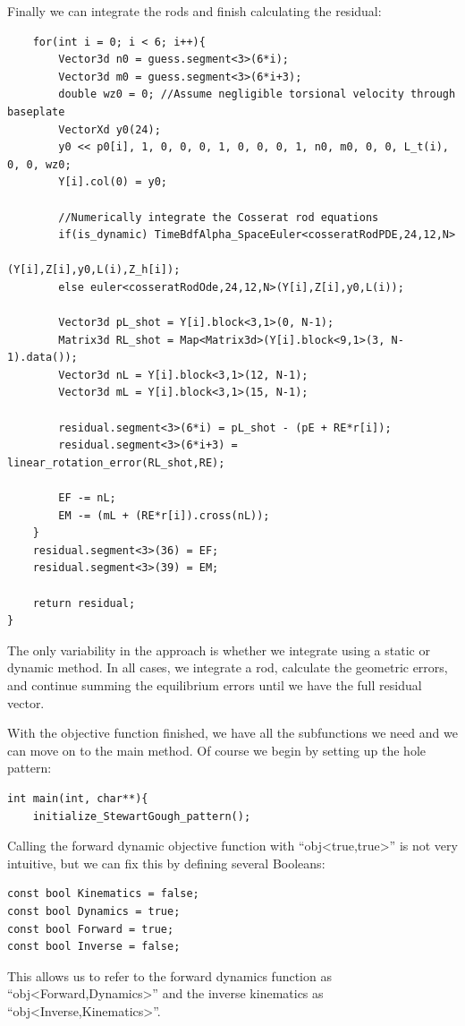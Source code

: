 \documentclass[12pt]{article}
\begin{document}
Finally we can integrate the rods and finish calculating the residual:
\begin{lstlisting}
    for(int i = 0; i < 6; i++){
        Vector3d n0 = guess.segment<3>(6*i);
        Vector3d m0 = guess.segment<3>(6*i+3);
        double wz0 = 0; //Assume negligible torsional velocity through baseplate
        VectorXd y0(24);
        y0 << p0[i], 1, 0, 0, 0, 1, 0, 0, 0, 1, n0, m0, 0, 0, L_t(i), 0, 0, wz0;
        Y[i].col(0) = y0;

        //Numerically integrate the Cosserat rod equations
        if(is_dynamic) TimeBdfAlpha_SpaceEuler<cosseratRodPDE,24,12,N>
                                              (Y[i],Z[i],y0,L(i),Z_h[i]);
        else euler<cosseratRodOde,24,12,N>(Y[i],Z[i],y0,L(i));

        Vector3d pL_shot = Y[i].block<3,1>(0, N-1);
        Matrix3d RL_shot = Map<Matrix3d>(Y[i].block<9,1>(3, N-1).data());
        Vector3d nL = Y[i].block<3,1>(12, N-1);
        Vector3d mL = Y[i].block<3,1>(15, N-1);

        residual.segment<3>(6*i) = pL_shot - (pE + RE*r[i]);
        residual.segment<3>(6*i+3) = linear_rotation_error(RL_shot,RE);

        EF -= nL;
        EM -= (mL + (RE*r[i]).cross(nL));
    }
    residual.segment<3>(36) = EF;
    residual.segment<3>(39) = EM;
		
    return residual;
}
\end{lstlisting}
The only variability in the approach is whether we integrate using a static or dynamic method. In all cases, we integrate a rod, calculate the geometric errors, and continue summing the equilibrium errors until we have the full residual vector.

With the objective function finished, we have all the subfunctions we need and we can move on to the main method. Of course we begin by setting up the hole pattern:
\begin{lstlisting}
int main(int, char**){
    initialize_StewartGough_pattern();
\end{lstlisting}
Calling the forward dynamic objective function with ``obj<true,true>'' is not very intuitive, but we can fix this by defining several Booleans:
\begin{lstlisting}
const bool Kinematics = false;
const bool Dynamics = true;
const bool Forward = true;
const bool Inverse = false;
\end{lstlisting}
This allows us to refer to the forward dynamics function as ``obj<Forward,Dynamics>'' and the inverse kinematics as ``obj<Inverse,Kinematics>''.
\end{document}
